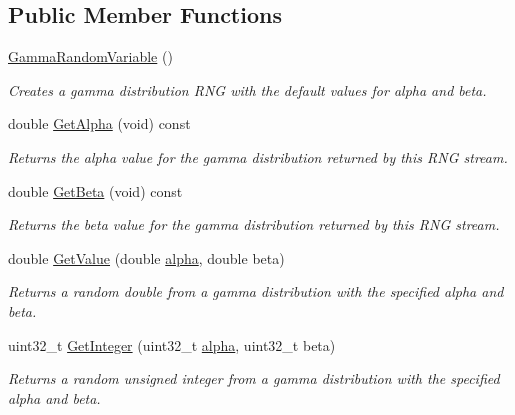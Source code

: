 \subsection*{Public Member Functions}
\begin{DoxyCompactItemize}
\item 
\hyperlink{classns3_1_1GammaRandomVariable_a40cf523e87325e179725e584f4a86698}{Gamma\+Random\+Variable} ()
\begin{DoxyCompactList}\small\item\em Creates a gamma distribution R\+NG with the default values for alpha and beta. \end{DoxyCompactList}\item 
double \hyperlink{classns3_1_1GammaRandomVariable_a5cf2d9245c899a237a7f1b9d9070b3fd}{Get\+Alpha} (void) const 
\begin{DoxyCompactList}\small\item\em Returns the alpha value for the gamma distribution returned by this R\+NG stream. \end{DoxyCompactList}\item 
double \hyperlink{classns3_1_1GammaRandomVariable_a678fd6163bb9e2fdd1944d6f67567c0d}{Get\+Beta} (void) const 
\begin{DoxyCompactList}\small\item\em Returns the beta value for the gamma distribution returned by this R\+NG stream. \end{DoxyCompactList}\item 
double \hyperlink{classns3_1_1GammaRandomVariable_a4bc336892413eab5ba6e1a046cda8bde}{Get\+Value} (double \hyperlink{lte__uplink__power__control_8m_a62197192f0fbf4e0675eb37be1c4c175}{alpha}, double beta)
\begin{DoxyCompactList}\small\item\em Returns a random double from a gamma distribution with the specified alpha and beta. \end{DoxyCompactList}\item 
uint32\+\_\+t \hyperlink{classns3_1_1GammaRandomVariable_a1908ecc336f1897358292718b9db4759}{Get\+Integer} (uint32\+\_\+t \hyperlink{lte__uplink__power__control_8m_a62197192f0fbf4e0675eb37be1c4c175}{alpha}, uint32\+\_\+t beta)
\begin{DoxyCompactList}\small\item\em Returns a random unsigned integer from a gamma distribution with the specified alpha and beta. \end{DoxyCompactList}\item 

\end{DoxyCompactItemize}

